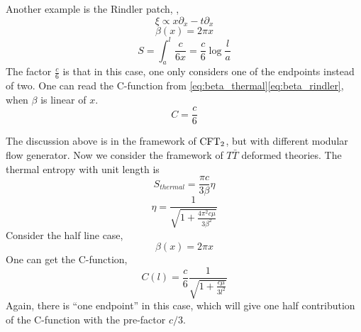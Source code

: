 \documentclass[11pt,a4paper]{article}
\newcommand{\TTbar}{\ensuremath{T\bar{T}}\xspace}
\begin{document}
	Another example is the Rindler patch, ,
	\begin{equation}
	\xi\propto x\partial_x-t\partial_x
	\end{equation}
	\begin{equation}
	\beta(x)=2\pi x
	\label{eq:beta_rindler}
	\end{equation}
	\begin{equation}
	S=\int_{a}^{l}\frac{c}{6x}=\frac{c}{6}\log \frac{l}{a}
	\end{equation}
	The factor $\frac{c}{6}$ is that in this case, one only considers one of the endpoints instead of two. One can read the C-function from \eqref{eq:beta_thermal}\eqref{eq:beta_rindler}, when $\beta$ is linear of $x$.
	\begin{equation}
	C=\frac{c}{6}
	\end{equation}
	
	The discussion above is in the framework of $\mathrm{CFT}_2$, but with different modular flow generator. Now we consider the framework of \TTbar deformed theories. The thermal entropy with unit length is
	\begin{equation}
	S_{thermal}=\frac{\pi c}{3\beta}\eta
	\end{equation}
	\begin{equation}
	\eta=\frac{1}{\sqrt{1+\frac{4\pi^2c\mu}{3\beta^2}}}
	\end{equation}
	Consider the half line case,
	\begin{equation}
	\beta(x)=2\pi x
	\end{equation}
	One can get the C-function,
	\begin{equation}
	C(l)=\frac{c}{6}\frac{1}{\sqrt{1+\frac{c\mu}{3l^2}}}
	\end{equation}
	Again, there is ``one endpoint'' in this case, which will give one half contribution of the C-function with the pre-factor $c/3$.
	
	
	
	
	


\FloatBarrier

\pagebreak

 





\end{document}
